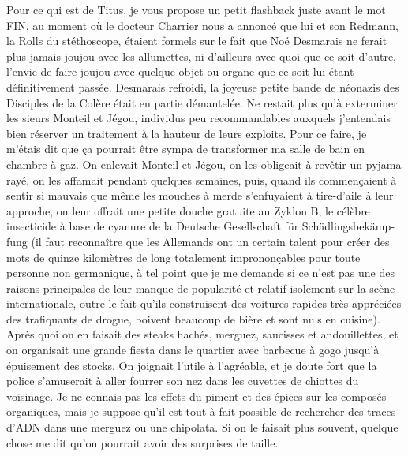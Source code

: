 Pour ce qui est de Titus, je vous propose un petit flashback juste avant le mot FIN, au moment où le docteur Charrier nous a annoncé que lui et son Redmann, la Rolls du stéthoscope, étaient formels sur le fait que Noé Desmarais ne ferait plus jamais joujou avec les allumettes, ni d’ailleurs avec quoi que ce soit d’autre, l’envie de faire joujou avec quelque objet ou organe que ce soit lui étant définitivement passée. Desmarais refroidi, la joyeuse petite bande de néonazis des Disciples de la Colère était en partie démantelée. Ne restait plus qu’à exterminer les sieurs Monteil et Jégou, individus peu recommandables auxquels j’entendais bien réserver un traitement à la hauteur de leurs exploits. Pour ce faire, je m’étais dit que ça pourrait être sympa de transformer ma salle de bain en chambre à gaz. On enlevait Monteil et Jégou, on les obligeait à revêtir un pyjama rayé, on les affamait pendant quelques semaines, puis, quand ils commençaient à sentir si mauvais que même les mouches à merde s’enfuyaient à tire-d’aile à leur approche, on leur offrait une petite douche gratuite au Zyklon B, le célèbre insecticide à base de cyanure de la \foreignlanguage{german}{Deutsche Gesellschaft für Schädlingsbekämpfung} (il faut reconnaître que les Allemands ont un certain talent pour créer des mots de quinze kilomètres de long totalement imprononçables pour toute personne non germanique, à tel point que je me demande si ce n’est pas une des raisons principales de leur manque de popularité et relatif isolement sur la scène internationale, outre le fait qu’ils construisent des voitures rapides très appréciées des trafiquants de drogue, boivent beaucoup de bière et sont nuls en cuisine). Après quoi on en faisait des steaks hachés, merguez, saucisses et andouillettes, et on organisait une grande fiesta dans le quartier avec barbecue à gogo jusqu’à épuisement des stocks. On joignait l’utile à l’agréable, et je doute fort que la police s’amuserait à aller fourrer son nez dans les cuvettes de chiottes du voisinage. Je ne connais pas les effets du piment et des épices sur les composés organiques, mais je suppose qu’il est tout à fait possible de rechercher des traces d’ADN dans une merguez ou une chipolata. Si on le faisait plus souvent, quelque chose me dit qu’on pourrait avoir des surprises de taille.


